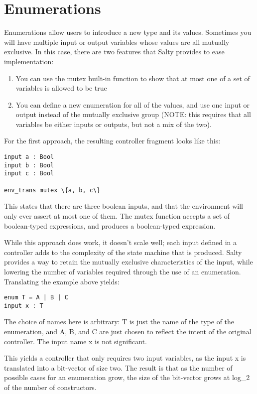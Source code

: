 \section{Enumerations}

Enumerations allow users to introduce a new type and its values. Sometimes you will have multiple input or output variables whose values are all mutually exclusive. In this case, there are two features that Salty provides to ease implementation:

\begin{enumerate}
\item You can use the mutex built-in function to show that at most one of a set of variables is allowed to be true
\item You can define a new enumeration for all of the values, and use one input or output instead of the mutually exclusive group (NOTE: this requires that all variables be either inputs or outputs, but not a mix of the two).
\end{enumerate}

\noindent For the first approach, the resulting controller fragment looks like this:

\begin{lstlisting}
input a : Bool
input b : Bool
input c : Bool

env_trans mutex \{a, b, c\}
\end{lstlisting}
This states that there are three boolean inputs, and that the environment will only ever assert at most one of them. The mutex function accepts a set of boolean-typed expressions, and produces a boolean-typed expression.

While this approach does work, it doesn't scale well; each input defined in a controller adds to the complexity of the state machine that is produced. Salty provides a way to retain the mutually exclusive characteristics of the input, while lowering the number of variables required through the use of an enumeration. Translating the example above yields:
\begin{lstlisting}
enum T = A | B | C
input x : T
\end{lstlisting}
The choice of names here is arbitrary: T is just the name of the type of the enumeration, and A, B, and C are just chosen to reflect the intent of the original controller. The input name x is not significant.

This yields a controller that only requires two input variables, as the input x is translated into a bit-vector of size two. The result is that as the number of possible cases for an enumeration grow, the size of the bit-vector grows at log\_2 of the number of constructors.\begin{lstlisting}
\end{lstlisting}

